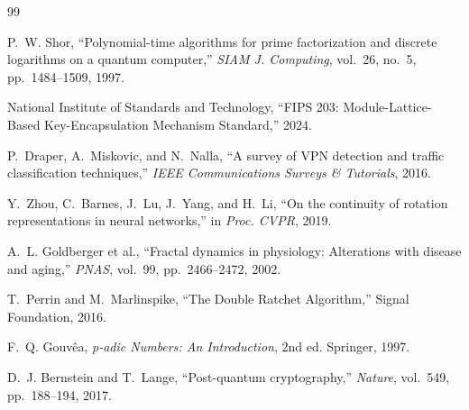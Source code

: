 \documentclass[11pt,a4paper]{article}
\begin{document}
\begin{thebibliography}{99}

P.~W. Shor, ``Polynomial-time algorithms for prime factorization and
discrete logarithms on a quantum computer,'' \textit{SIAM J. Computing},
vol.~26, no.~5, pp.~1484--1509, 1997.

National Institute of Standards and Technology, ``FIPS 203:
Module-Lattice-Based Key-Encapsulation Mechanism Standard,'' 2024.

P.~Draper, A.~Miskovic, and N.~Nalla, ``A survey of VPN detection and
traffic classification techniques,'' \textit{IEEE Communications Surveys
\& Tutorials}, 2016.

Y.~Zhou, C.~Barnes, J.~Lu, J.~Yang, and H.~Li, ``On the continuity of
rotation representations in neural networks,'' in \textit{Proc. CVPR},
2019.

A.~L. Goldberger et al., ``Fractal dynamics in physiology: Alterations
with disease and aging,'' \textit{PNAS}, vol.~99, pp.~2466--2472, 2002.

T.~Perrin and M.~Marlinspike, ``The Double Ratchet Algorithm,''
Signal Foundation, 2016.

F.~Q. Gouvêa, \textit{p-adic Numbers: An Introduction}, 2nd ed.
Springer, 1997.

D.~J. Bernstein and T.~Lange, ``Post-quantum cryptography,''
\textit{Nature}, vol.~549, pp.~188--194, 2017.

\end{thebibliography}
\end{document}
